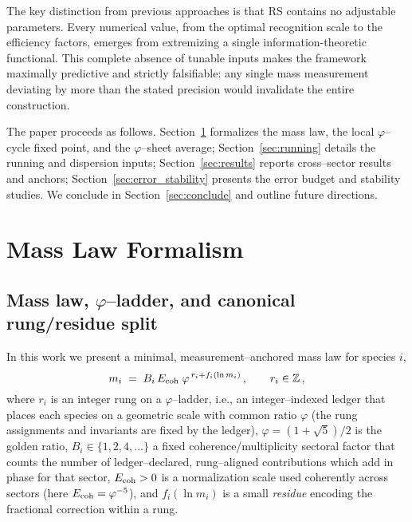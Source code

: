 \documentclass[%
  amsmath,amssymb,
  aps,
 prb,
 floatfix, showkeys
 ]{revtex4-2}
\begin{document}
 The key distinction from previous approaches is that RS contains no adjustable
 parameters. Every numerical value, from the optimal recognition scale
 to the efficiency factors, emerges from extremizing a single information-theoretic
 functional. This complete absence of tunable inputs makes the framework maximally
 predictive and strictly falsifiable: any single mass measurement deviating by more
 than the stated precision would invalidate the entire construction.
 
 The paper proceeds as follows. Section~\ref{sec:formalism} formalizes the mass law, the local $\varphi$–cycle fixed point, and the $\varphi$–sheet average; Section~\ref{sec:running} details the running and dispersion inputs; Section~\ref{sec:results} reports cross–sector results and anchors; Section~\ref{sec:error_stability} presents the error budget and stability studies. We conclude in Section~\ref{sec:conclude} and outline future directions.
 
 \section{Mass Law Formalism}
 \label{sec:formalism}
 \vspace{-1.0cm}
 \subsection{Mass law, $\varphi$--ladder, and canonical rung/residue split}
 \label{subsec:mass-law}
 
 In this work we present a minimal, measurement–anchored mass law for 
  species $i$, 
  \begin{equation}
   m_i \;=\; B_i\,E_{\rm coh}\;\varphi^{\,r_i+f_i(\ln m_i)}\,,\qquad r_i\in\mathbb{Z}\,,
   \label{eq:mass_law_intro}
 \end{equation}
 where $r_i$ is an integer rung on a $\varphi$–ladder, i.e., an integer–indexed ledger that places each species on a geometric scale with common ratio $\varphi$ (the rung assignments and invariants are fixed by the ledger),
 $\varphi = (1+\sqrt{5})/2$ is the golden ratio, 
 $B_i\in\{1,2,4,\dots\}$ a fixed coherence/multiplicity sectoral factor
 that counts the number of ledger–declared, rung–aligned contributions which add in
 phase for that sector,
  $E_{\rm coh}>0$ is a normalization scale used coherently across sectors (here $E_{\rm coh}=\varphi^{-5}$),
 and
  $f_i(\ln m_i)$ is a small  \emph{residue} encoding the fractional correction within a rung.
 
\end{document}
